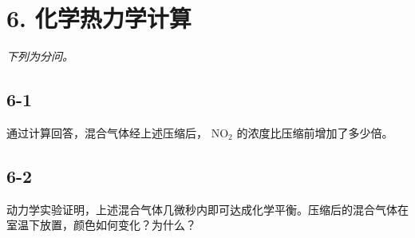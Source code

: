 \section*{6. 化学热力学计算}
\textit{下列为分问。}

\subsection*{6-1}
通过计算回答，混合⽓体经上述压缩后， $\mathrm { N O } _ { 2 }$ 的浓度⽐压缩前增加了多少倍。

\subsection*{6-2}
动⼒学实验证明，上述混合⽓体⼏微秒内即可达成化学平衡。压缩后的混合⽓体在室温下放置，颜⾊如何变化？为什么？
